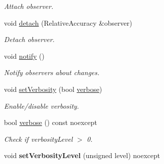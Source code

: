 \begin{DoxyCompactItemize}
\begin{DoxyCompactList}\small\item\em Attach observer. \end{DoxyCompactList}\item 
\hypertarget{classSpacy_1_1Mixin_1_1MixinConnection_adda739590c487679c26f60e50aedb73f}{}void \hyperlink{classSpacy_1_1Mixin_1_1MixinConnection_adda739590c487679c26f60e50aedb73f}{detach} (Relative\+Accuracy \&observer)\label{classSpacy_1_1Mixin_1_1MixinConnection_adda739590c487679c26f60e50aedb73f}

\begin{DoxyCompactList}\small\item\em Detach observer. \end{DoxyCompactList}\item 
\hypertarget{classSpacy_1_1Mixin_1_1MixinConnection_a1ddeaa78a3bb4a38c2cca36d1f99fe36}{}void \hyperlink{classSpacy_1_1Mixin_1_1MixinConnection_a1ddeaa78a3bb4a38c2cca36d1f99fe36}{notify} ()\label{classSpacy_1_1Mixin_1_1MixinConnection_a1ddeaa78a3bb4a38c2cca36d1f99fe36}

\begin{DoxyCompactList}\small\item\em Notify observers about changes. \end{DoxyCompactList}\item 
void \hyperlink{classSpacy_1_1Mixin_1_1Verbosity_a0365d293ab27e27da9496c668020aefb}{set\+Verbosity} (bool \hyperlink{classSpacy_1_1Mixin_1_1Verbosity_ad367a7328578546938fd2a7e52ab3793}{verbose})
\begin{DoxyCompactList}\small\item\em Enable/disable verbosity. \end{DoxyCompactList}\item 
\hypertarget{classSpacy_1_1Mixin_1_1Verbosity_ad367a7328578546938fd2a7e52ab3793}{}bool \hyperlink{classSpacy_1_1Mixin_1_1Verbosity_ad367a7328578546938fd2a7e52ab3793}{verbose} () const noexcept\label{classSpacy_1_1Mixin_1_1Verbosity_ad367a7328578546938fd2a7e52ab3793}

\begin{DoxyCompactList}\small\item\em Check if verbosity\+Level $>$ 0. \end{DoxyCompactList}\item 
\hypertarget{classSpacy_1_1Mixin_1_1Verbosity_af84a4b3c933f252a5840ab63d4a38325}{}void {\bfseries set\+Verbosity\+Level} (unsigned level) noexcept\label{classSpacy_1_1Mixin_1_1Verbosity_af84a4b3c933f252a5840ab63d4a38325}


\end{DoxyCompactItemize}

